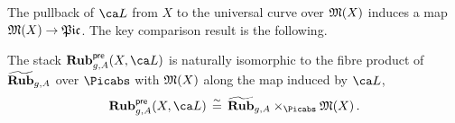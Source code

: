 The pullback of $\ca L$ from $X$ to the universal curve over $\frak M(X)$ induces a map $\frak M(X) \to \frak{Pic}$. The key comparison result is the following.



\begin{proposition}
\notready\label{lem:prestable_stack_comparison}
The stack $\cat{Rub}_{g,A}^{\pre}(X, \ca L)$ is naturally isomorphic to the fibre product of $\widetilde{\mathbf{Rub}}_{g,A}$ over $\Picabs$ with $\frak M(X)$ along the map induced by $\ca L$,
$$\cat{Rub}_{g,A}^{\pre}(X, \ca L)\,  \stackrel{\sim}{=}\,  \newRub_{g,A} \times_{\Picabs} {\frak{M}(X)} \, .$$
\end{proposition}
